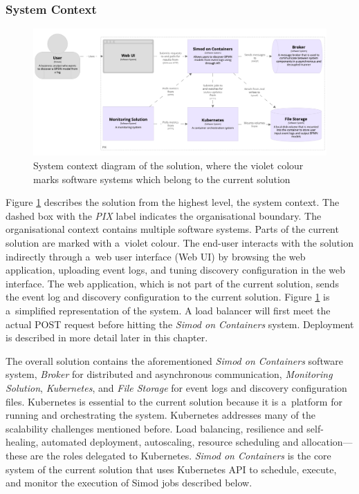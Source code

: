 \documentclass[12pt]{article}
\begin{document}
\subsubsection{System Context}

\begin{figure}
    \centering
    \includegraphics[width=\textwidth]{figures/structurizr-1-simodOnContainers.png}
    \caption{System context diagram of the solution, where the violet colour marks software systems which belong to the current solution}
    \label{fig:system_landscape}
\end{figure}

Figure \ref{fig:system_landscape} describes the solution from the highest level, the system context. The dashed box with the \emph{PIX} label indicates the organisational boundary. The organisational context contains multiple software systems. Parts of the current solution are marked with a~violet colour. The end-user interacts with the solution indirectly through a~web user interface (Web UI) by browsing the web application, uploading event logs, and tuning discovery configuration in the web interface. The web application, which is not part of the current solution, sends the event log and discovery configuration to the current solution. Figure \ref{fig:system_landscape} is a~simplified representation of the system. A load balancer will first meet the actual POST request before hitting the \emph{Simod on Containers} system. Deployment is described in more detail later in this chapter.

The overall solution contains the aforementioned \emph{Simod on Containers} software system, \emph{Broker} for distributed and asynchronous communication, \emph{Monitoring Solution}, \emph{Kubernetes}, and \emph{File Storage} for event logs and discovery configuration files. Kubernetes is essential to the current solution because it is a~platform for running and orchestrating the system. Kubernetes addresses many of the scalability challenges mentioned before. Load balancing, resilience and self-healing, automated deployment, autoscaling, resource scheduling and allocation---these are the roles delegated to Kubernetes. \emph{Simod on Containers} is the core system of the current solution that uses Kubernetes API to schedule, execute, and monitor the execution of Simod jobs described below.
\end{document}
